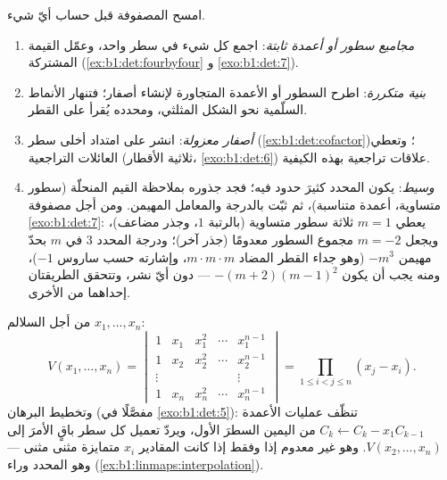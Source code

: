 \begin{method}
\label{met:b1:det:strategy}
امسح المصفوفة قبل حساب أيّ شيء.
\begin{enumerate}
  \item \emph{مجاميع سطور أو أعمدة ثابتة}: اجمع كل شيء في
        سطر واحد، وعمّل القيمة المشتركة
        (\cref{ex:b1:det:fourbyfour} و \cref{exo:b1:det:7}).
  \item \emph{بنية متكررة}: اطرح السطور أو الأعمدة
        المتجاورة لإنشاء أصفار؛ فتنهار الأنماط السلّمية
        نحو الشكل المثلثي، ومحدده يُقرأ على
        القطر.
  \item \emph{أصفار معزولة}: انشر على امتداد أخلى سطر
        (\cref{ex:b1:det:cofactor})؛ وتعطي العائلات
        التراجعية (ثلاثية الأقطار، \cref{exo:b1:det:6}) علاقات تراجعية
        بهذه الكيفية.
  \item \emph{وسيط}: يكون المحدد كثيرَ حدود
        فيه؛ فجد جذوره بملاحظة القيم المنحلّة
        (سطور متساوية، أعمدة متناسبة)، ثم ثبّت
         بالدرجة والمعامل المهيمن. ومن أجل
        مصفوفة \cref{exo:b1:det:7}: يعطي $m = 1$ ثلاثة
        سطور متساوية (بالرتبة $1$، وجذر مضاعف)، ويجعل $m = -2$
        مجموع السطور معدومًا (جذر آخر)؛ ودرجة المحدد
        $3$ في $m$ بحدّ مهيمن $-m^3$ (وهو
        جداء القطر المضاد $m\cdot m\cdot m$، وإشارته حسب
        ساروس $-1$)، ومنه يجب أن يكون $-(m+2)(m-1)^2$ --- دون أيّ
        نشر، وتتحقق الطريقتان إحداهما من الأخرى.
\end{enumerate}
\end{method}

\begin{example}\label{ex:b1:det:vandermonde}
من أجل السلالم $x_1, \dots, x_n$:
\[
V(x_1, \dots, x_n) =
\begin{vmatrix}
1 & x_1 & x_1^2 & \cdots & x_1^{n-1}\\
1 & x_2 & x_2^2 & \cdots & x_2^{n-1}\\
\vdots & & & & \vdots\\
1 & x_n & x_n^2 & \cdots & x_n^{n-1}
\end{vmatrix}
= \prod_{1 \leq i < j \leq n} (x_j - x_i) .
\]
وتخطيط البرهان (مفصَّلًا في \cref{exo:b1:det:5}): تنظّف عمليات
الأعمدة $C_k \leftarrow C_k - x_1 C_{k-1}$ من اليمين السطرَ
الأول، ويردّ تعميل كل سطر باقٍ الأمرَ إلى
$V(x_2, \dots, x_n)$. وهو غير معدوم إذا وفقط إذا كانت المقادير $x_i$ متمايزة مثنى مثنى
--- وهو المحدد وراء 
(\cref{ex:b1:linmaps:interpolation}).
\end{example}

